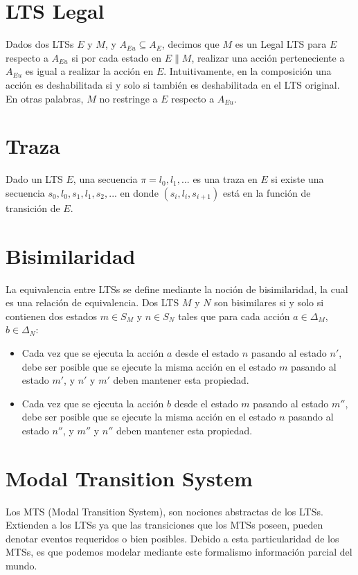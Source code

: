 \section{LTS Legal}
Dados dos LTSs $E$ y $M$, y $A_{Eu} \subseteq A_{E}$, decimos que $M$ es un Legal LTS para $E$ respecto a $A_{Eu}$ si por cada
estado en $E\parallel$$M$, realizar una acción perteneciente a $A_{Eu}$ es igual a realizar la acción en $E$.
Intuitivamente, en la composición una acción es deshabilitada si y solo si también es deshabilitada en el LTS original.
En otras palabras, $M$ no restringe a $E$ respecto a $A_{Eu}$.

\section{Traza}

Dado un LTS $E$, una secuencia $\pi = l_{0}, l_{1}, ...$ es una traza en $E$ si existe una secuencia 
$s_{0}, l_{0}, s_{1}, l_{1}, s_{2}, ...$ en donde $(s_{i}, l_{i}, s_{i + 1})$ está en la función de transición de $E$.

\section{Bisimilaridad}
La equivalencia entre LTSs se define mediante la noción de bisimilaridad, la cual es una relación de equivalencia.
Dos LTS $M$ y $N$ son bisimilares si y solo si contienen dos estados $m \in S_{M}$ y $n \in S_{N}$ tales que para cada
acción $a \in \Delta_{M}$, $b \in \Delta_{N}$:
\begin{itemize}

\item
Cada vez que se ejecuta la acción $a$ desde el estado $n$ pasando al estado $n'$, debe ser posible que se ejecute 
la misma acción en el estado $m$ pasando al estado $m'$, y $n'$ y $m'$ deben mantener esta propiedad.

\item
Cada vez que se ejecuta la acción $b$ desde el estado $m$ pasando al estado $m''$, debe ser posible que se ejecute 
la misma acción en el estado $n$ pasando al estado $n''$, y $m''$ y $n''$ deben mantener esta propiedad.

\end{itemize}

\section{Modal Transition System}
Los MTS (Modal Transition System), son nociones abstractas de los LTSs. Extienden a los LTSs ya que las transiciones 
que los MTSs poseen, pueden denotar eventos requeridos o bien posibles. Debido a esta particularidad de los MTSs, es 
que podemos modelar mediante este formalismo información parcial del mundo.

